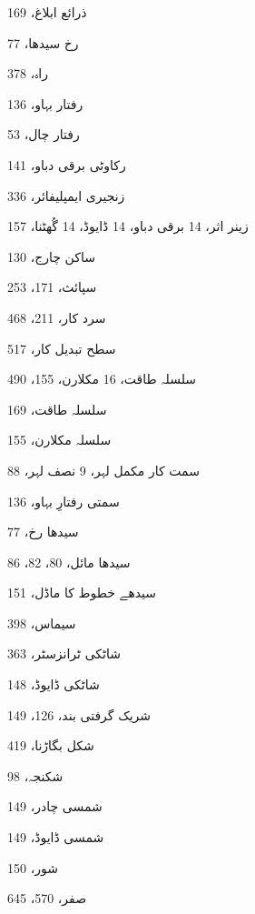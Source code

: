 \begin{theindex}
\indexspace

\item ذرائع ابلاغ، 169

\indexspace

\item رخ 
     \subitem سیدھا، 77
\item راہ، 378
\item رفتار بہاو، 136
\item رفتار چال، 53
\item رکاوٹی برقی دباو، 141

\indexspace

\item زنجیری ایمپلیفائر، 336
\item زینر 
     \subitem اثر، 14 
     \subitem برقی دباو، 14 
     \subitem ڈایوڈ، 14 
     \subitem گُھٹنا، 157

\indexspace

\item ساکن چارج، 130
\item سپائث، 171، 253
\item سرد کار، 211، 468
\item سطح تبدیل کار، 517
\item سلسلہ 
     \subitem طاقت، 16 
     \subitem مکلارن، 155، 490
\item سلسلہ طاقت، 169
\item سلسلہ مکلارن، 155
\item سمت کار 
     \subitem مکمل لہر، 9 
     \subitem نصف لہر، 88
\item سمتی رفتارِ بہاو، 136
\item سیدھا رخ، 77
\item سیدھا مائل، 80، 82، 86
\item سیدھے خطوط کا ماڈل، 151
\item سیماس، 398

\indexspace

\item شاٹکی ٹرانزسٹر، 363
\item شاٹکی ڈایوڈ، 148
\item شریک گرفتی بند، 126، 149
\item شکل بگاڑنا، 419
\item شکنجہ، 98
\item شمسی چادر، 149
\item شمسی ڈایوڈ، 149
\item شور، 150

\indexspace

\item صفر، 570، 645


\end{theindex}
